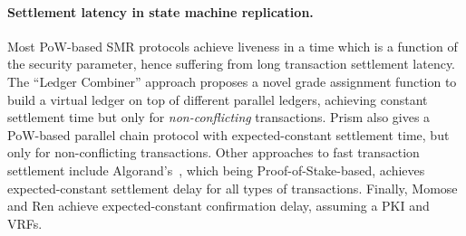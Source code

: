 \paragraph{Settlement latency in state machine replication.}
%
Most PoW-based SMR protocols achieve liveness in a time which is a function of the security parameter, hence suffering from long transaction settlement latency.
%
The ``Ledger Combiner'' approach \cite{TCC:FGKR20} proposes a novel grade assignment function to build a virtual ledger on top of different parallel ledgers, achieving constant settlement time but only for \emph{non-conflicting} transactions.
%
Prism \cite{CCS:BKTFV19} also gives a PoW-based parallel chain protocol with expected-constant settlement time, but only for non-conflicting transactions.
%
Other approaches to fast transaction settlement include Algorand's~\cite{TCS:CheMic19}, which being Proof-of-Stake-based, achieves expected-constant settlement delay for all types of transactions.
%
Finally, Momose and Ren \cite{CCS:MomRen22} achieve expected-constant confirmation delay, assuming a PKI and VRFs.
